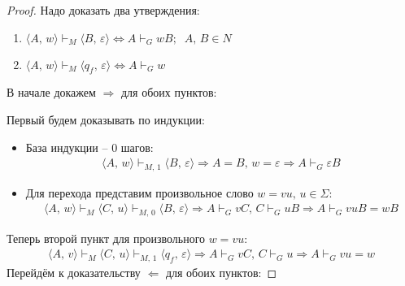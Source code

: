 \documentclass[a4paper,12pt]{article}
\theoremstyle{plain}
\theoremstyle{definition}
\theoremstyle{remark}
\begin{document}
\begin{proof}
	Надо доказать два утверждения:
	\begin{enumerate}
		\item $\langle A,\, w\rangle \vdash_M \langle B,\, \varepsilon\rangle \Leftrightarrow A \vdash_G wB;\;\; A,\,B \in N$
		\item $\langle A,\, w\rangle \vdash_M \langle q_f,\, \varepsilon\rangle \Leftrightarrow A \vdash_G w$
	\end{enumerate}

	В начале докажем $\Rightarrow$ для обоих пунктов:

	Первый будем доказывать по индукции:
	\begin{itemize}
		\item База индукции -- 0 шагов:
		      \begin{align*}
			      \langle A,\, w\rangle \vdash_{M,\, 1} \langle B,\, \varepsilon\rangle \Rightarrow A = B,\, w = \varepsilon \Rightarrow A \vdash_G \varepsilon B
		      \end{align*}
		\item Для перехода представим произвольное слово $w = vu,\, u \in \Sigma$:
		      \begin{align*}
			      \langle A,\, w\rangle \vdash_M \langle C,\, u\rangle \vdash_{M,\,0} \langle B,\, \varepsilon\rangle \Rightarrow A \vdash_G vC,\, C \vdash_G uB \Rightarrow A \vdash_G vuB = wB
		      \end{align*}
	\end{itemize}
	Теперь второй пункт для произвольного $w = vu$:
	\begin{align*}
		\langle A,\, v\rangle \vdash_M \langle C,\, u\rangle \vdash_{M,\,1} \langle q_f,\, \varepsilon\rangle \Rightarrow A \vdash_G vC,\, C \vdash_G u \Rightarrow A \vdash_G vu = w
	\end{align*}
	Перейдём к доказательству $\Leftarrow$ для обоих пунктов:


\end{proof}
\end{document}
